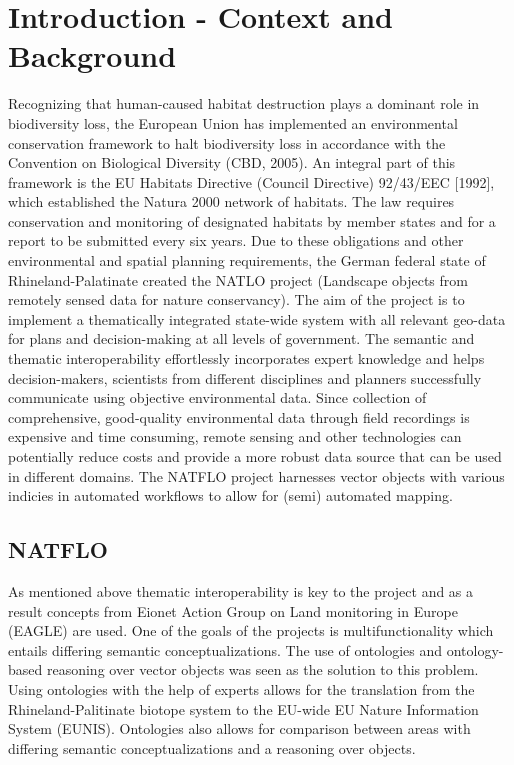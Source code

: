 \documentclass[authoryear, review,12pt,number]{elsarticle}
\begin{document}
\section{Introduction - Context and Background}
Recognizing that human-caused habitat destruction plays a dominant role in
biodiversity loss, the European Union has implemented an environmental
conservation framework to halt biodiversity loss in accordance with the
Convention on Biological Diversity (CBD, 2005). An integral part of this
framework is the EU Habitats Directive (Council Directive) 92/43/EEC [1992],
which established the Natura 2000 network of habitats. The law requires
conservation and monitoring of designated habitats by member states and for a
report to be submitted every six years. Due to these obligations and other
environmental and spatial planning requirements, the German federal state of
Rhineland-Palatinate created the NATLO project (Landscape objects from remotely
sensed data for nature conservancy). The aim of the project is to implement a
thematically integrated state-wide system with all relevant geo-data for plans
and decision-making at all levels of government. The semantic and thematic interoperability
effortlessly incorporates expert knowledge and helps decision-makers, scientists
from different disciplines and planners successfully communicate using
objective environmental data.
Since collection of comprehensive,
good-quality environmental data through field recordings is expensive and time
consuming, remote sensing and other technologies can potentially reduce costs
and provide a more robust data source that can be used in different domains. The
NATFLO project harnesses vector objects with various indicies in automated
workflows to allow for (semi) automated mapping. %
\subsection{NATFLO}
As mentioned above thematic interoperability is key to the project and as a
result concepts from Eionet Action Group on Land monitoring in Europe (EAGLE)
are used.
One of the goals of the projects is
multifunctionality which entails differing semantic conceptualizations. The use
of ontologies and ontology-based reasoning over vector objects was seen as the
solution to this problem. Using ontologies with the help of experts allows for
the translation from the Rhineland-Palitinate biotope system to the EU-wide EU
Nature Information System (EUNIS). Ontologies also allows
for comparison between areas with differing semantic conceptualizations and a
reasoning over objects. 
\end{document}
